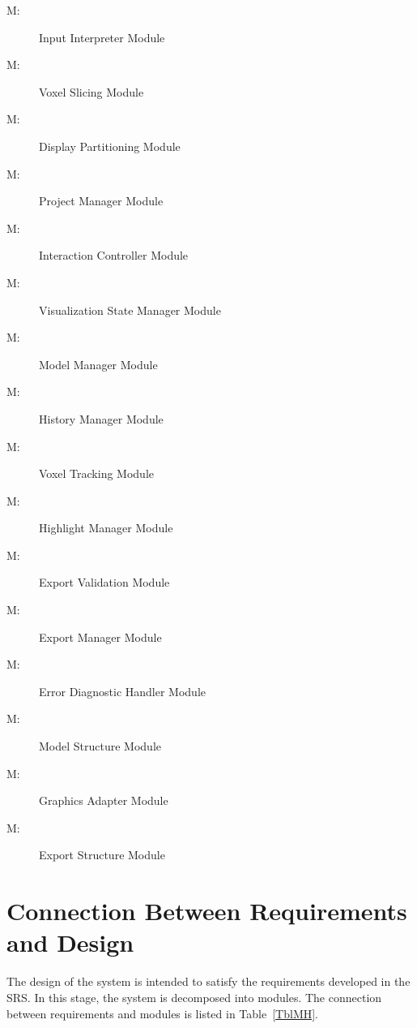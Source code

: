 \documentclass[12pt, titlepage]{article}
\newcounter{mnum}
\newcommand{\mthemnum}{M\themnum}
\begin{document}
\begin{description}
\item [ \mthemnum\label{m1}:] Input Interpreter Module
\item [ \mthemnum\label{m2}:] Voxel Slicing Module
\item [ \mthemnum\label{m3}:] Display Partitioning Module
\item [ \mthemnum\label{m4}:] Project Manager Module
\item [ \mthemnum\label{m7}:] Interaction Controller Module
\item [ \mthemnum\label{m8}:] Visualization State Manager Module
\item [ \mthemnum\label{m9}:] Model Manager Module
\item [ \mthemnum\label{m10}:] History Manager Module
\item [ \mthemnum\label{m12}:] Voxel Tracking Module
\item [ \mthemnum\label{m13}:] Highlight Manager Module
\item [ \mthemnum\label{m14}:] Export Validation Module
\item [ \mthemnum\label{m15}:] Export Manager Module
\item [ \mthemnum\label{m16}:] Error Diagnostic Handler Module

\item [ \mthemnum\label{m17}:] Model Structure Module
\item [ \mthemnum\label{m18}:] Graphics Adapter Module
\item [ \mthemnum\label{m20}:] Export Structure Module
\end{description}




\section{Connection Between Requirements and Design}\label{SecConnection}

The design of the system is intended to satisfy the requirements developed in
the SRS. In this stage, the system is decomposed into modules. The connection
between requirements and modules is listed in Table~\ref{TblMH}.
\end{document}
